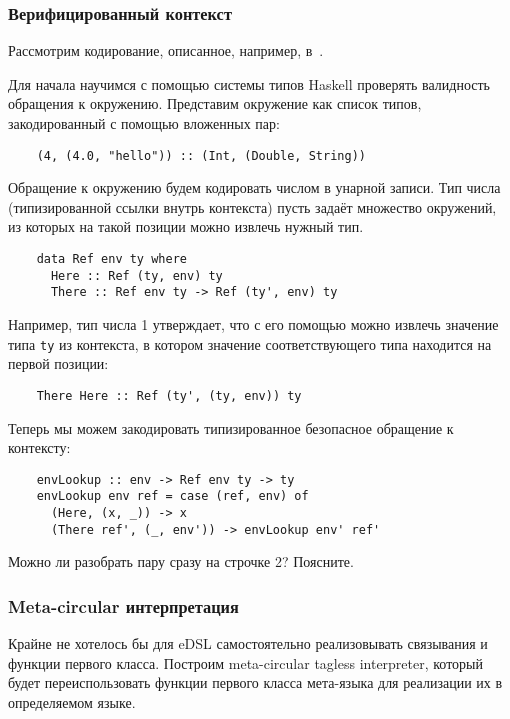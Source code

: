 \subsubsection{Верифицированный контекст}

Рассмотрим кодирование, описанное, например, в~\cite{kiselyov2012typed}.

Для начала научимся с помощью системы типов Haskell проверять валидность обращения к окружению.
Представим окружение как список типов, закодированный с помощью вложенных пар:
\begin{verbatim}
    (4, (4.0, "hello")) :: (Int, (Double, String))
\end{verbatim}

Обращение к окружению будем кодировать числом в унарной записи.
Тип числа (типизированной ссылки внутрь контекста) пусть задаёт множество окружений, из которых на такой позиции можно извлечь нужный тип.
\begin{verbatim}
    data Ref env ty where
      Here :: Ref (ty, env) ty
      There :: Ref env ty -> Ref (ty', env) ty
\end{verbatim}
Например, тип числа 1 утверждает, что с его помощью можно извлечь значение типа \texttt{ty} из контекста, в котором значение соответствующего типа находится на первой позиции:
\begin{verbatim}
    There Here :: Ref (ty', (ty, env)) ty
\end{verbatim}

Теперь мы можем закодировать типизированное безопасное обращение к контексту:
\begin{verbatim}
    envLookup :: env -> Ref env ty -> ty
    envLookup env ref = case (ref, env) of
      (Here, (x, _)) -> x
      (There ref', (_, env')) -> envLookup env' ref'
\end{verbatim}

\begin{task}
    Можно ли разобрать пару сразу на строчке 2?
    Поясните.
\end{task}

\subsubsection{Meta-circular интерпретация}

Крайне не хотелось бы для eDSL самостоятельно реализовывать связывания и функции первого класса.
Построим meta-circular tagless interpreter, который будет переиспользовать функции первого класса мета-языка для реализации их в определяемом языке.

